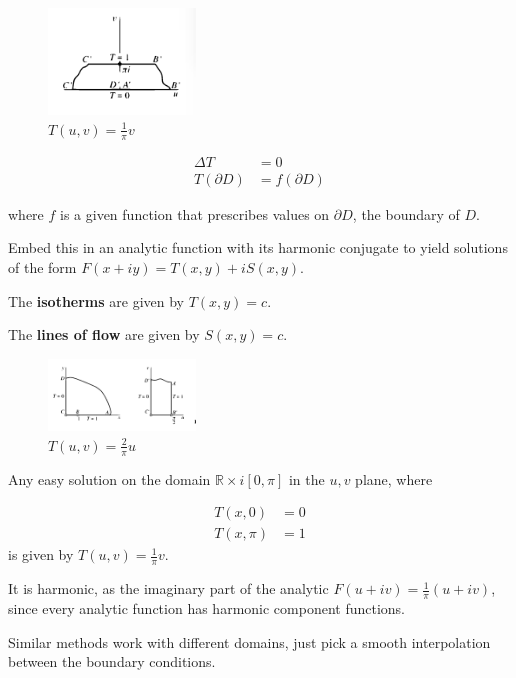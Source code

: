 \documentclass{article}
\begin{document}
\begin{figure}
\centering
\includegraphics[width=0.35\textwidth]{heat-eqn.png}
\caption{$T(u,v) = \frac{1}{\pi}v$}
\end{figure}

\begin{align*}
    \Delta T &= 0 \\
    T(\partial D) &= f(\partial D)
\end{align*}

where $f$ is a given function that prescribes values on $\partial D$, the boundary of $D$.

Embed this in an analytic function with its harmonic conjugate to yield solutions of the form $F(x+iy) = T(x,y) + iS(x,y)$.



The \textbf{isotherms} are given by $T(x,y) = c$.

The \textbf{lines of flow} are given by $S(x,y) = c$.

\begin{figure}
\centering
\includegraphics[width=0.35\textwidth]{sin.png}
\caption{$T(u,v) = \frac{2}{\pi}u$}
\end{figure}

Any easy solution on the domain $\mathbb{R} \times i[0,\pi]$ in the $u,v$ plane, where 

\begin{align*}
    T(x, 0) &= 0 \\
    T(x, \pi) &= 1
\end{align*} is given by $T(u,v) = \frac{1}{\pi}v$.

It is harmonic, as the imaginary part of the analytic $F(u+iv) = \frac{1}{\pi}(u+iv)$, since every analytic function has harmonic component functions.

Similar methods work with different domains, just pick a smooth interpolation between the boundary conditions.
\end{document}
